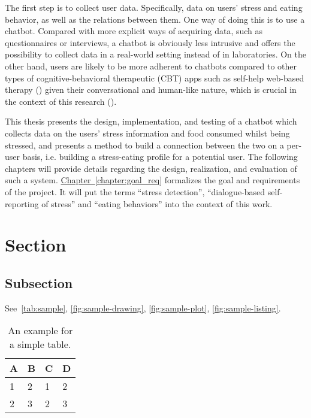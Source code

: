 \noindent The first step is to collect user data. Specifically, data on users’ stress and eating behavior, as well as the relations between them. One way of doing this is to use a chatbot. Compared with more explicit ways of acquiring data, such as questionnaires or interviews, a chatbot is obviously less intrusive and offers the possibility to collect data in a real-world setting instead of in laboratories. On the other hand, users are likely to be more adherent to chatbots compared to other types of cognitive-behavioral therapeutic (CBT) apps such as self-help web-based therapy (\cite{6_cbt}) given their conversational and human-like nature, which is crucial in the context of this research (\cite{3_woebot}).

This thesis presents the design, implementation, and testing of a chatbot which collects data on the users’ stress information and food consumed whilst being stressed, and presents a method to build a connection between the two on a per-user basis, i.e. building a stress-eating profile for a potential user. The following chapters will provide details regarding the design, realization, and evaluation of such a system. \hyperref[chapter:goal_req]{Chapter~\ref*{chapter:goal_req}} formalizes the goal and requirements of the project. It will put the terms “stress detection”, “dialogue-based self-reporting of stress” and “eating behaviors” into the context of this work.

\section{Section}

\subsection{Subsection}

See~\autoref{tab:sample}, \autoref{fig:sample-drawing}, \autoref{fig:sample-plot}, \autoref{fig:sample-listing}.

\begin{table}[htpb]
  \caption[Example table]{An example for a simple table.}\label{tab:sample}
  \centering
  \begin{tabular}{l l l l}
    \toprule
      A & B & C & D \\
    \midrule
      1 & 2 & 1 & 2 \\
      2 & 3 & 2 & 3 \\
    \bottomrule
  \end{tabular}
\end{table}


